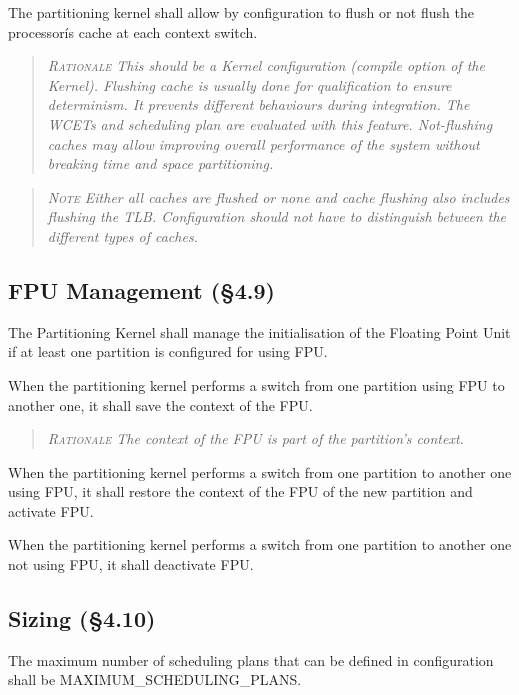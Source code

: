 The partitioning kernel shall allow by configuration to flush or not flush the processorís cache at each context switch.
\begin{quote}\it
\textsc{Rationale}
This should be a Kernel configuration (compile option of the Kernel).
Flushing cache is usually done for qualification to ensure determinism. It prevents different behaviours during integration. The WCETs and scheduling plan are evaluated with this feature.
Not-flushing caches may allow improving overall performance of the system without breaking time and space partitioning.
\end{quote}
\begin{quote}\it
\textsc{Note}
Either all caches are flushed or none and cache flushing also includes flushing the TLB. Configuration should not have to distinguish between the different types of caches.
\end{quote}

\subsection{FPU Management (\S4.9)}

The Partitioning Kernel shall manage the initialisation of the Floating Point Unit if at least one partition is configured for using FPU.

When the partitioning kernel performs a switch from one partition using FPU to another one, it shall save the context of the FPU.
\begin{quote}\it
\textsc{Rationale}
The context of the FPU is part of the partition's context.
\end{quote}

When the partitioning kernel performs a switch from one partition to another one using FPU, it shall restore the context of the FPU of the new partition and activate FPU.

When the partitioning kernel performs a switch from one partition to another one not using FPU, it shall deactivate FPU.

\subsection{Sizing (\S4.10)}

The maximum number of scheduling plans that can be defined in configuration shall be MAXIMUM\_SCHEDULING\_PLANS.

